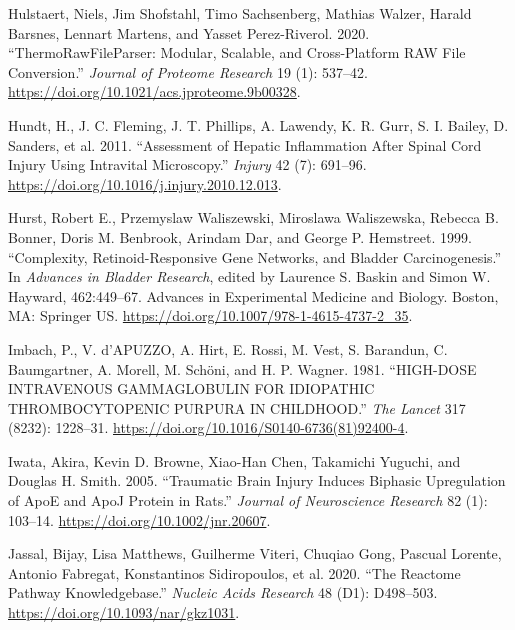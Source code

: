\documentclass[9pt,lineno]{elife}
\newlength{\cslhangindent}
\newlength{\cslentryspacingunit} %
\newenvironment{CSLReferences}[2] %
 {%
  \setlength{\parindent}{0pt}
  \ifodd #1
  \let\oldpar\par
  \def\par{\hangindent=\cslhangindent\oldpar}
  \fi
  \setlength{\parskip}{#2\cslentryspacingunit}
 }%
 {}
\begin{document}
\begin{landscape}
\begin{landscape}
\begin{landscape}
\begin{landscape}
\begin{CSLReferences}{1}{0}
\leavevmode{}%
Hulstaert, Niels, Jim Shofstahl, Timo Sachsenberg, Mathias Walzer, Harald Barsnes, Lennart Martens, and Yasset Perez-Riverol. 2020. {``{ThermoRawFileParser}: {Modular}, {Scalable}, and {Cross-Platform RAW File Conversion}.''} \emph{Journal of Proteome Research} 19 (1): 537--42. \url{https://doi.org/10.1021/acs.jproteome.9b00328}.

\leavevmode{}%
Hundt, H., J. C. Fleming, J. T. Phillips, A. Lawendy, K. R. Gurr, S. I. Bailey, D. Sanders, et al. 2011. {``Assessment of Hepatic Inflammation After Spinal Cord Injury Using Intravital Microscopy.''} \emph{Injury} 42 (7): 691--96. \url{https://doi.org/10.1016/j.injury.2010.12.013}.

\leavevmode{}%
Hurst, Robert E., Przemyslaw Waliszewski, Miroslawa Waliszewska, Rebecca B. Bonner, Doris M. Benbrook, Arindam Dar, and George P. Hemstreet. 1999. {``Complexity, {Retinoid-Responsive Gene Networks}, and {Bladder Carcinogenesis}.''} In \emph{Advances in {Bladder Research}}, edited by Laurence S. Baskin and Simon W. Hayward, 462:449--67. Advances in {Experimental Medicine} and {Biology}. {Boston, MA}: {Springer US}. \url{https://doi.org/10.1007/978-1-4615-4737-2_35}.

\leavevmode{}%
Imbach, P., V. d'APUZZO, A. Hirt, E. Rossi, M. Vest, S. Barandun, C. Baumgartner, A. Morell, M. Schöni, and H. P. Wagner. 1981. {``{HIGH-DOSE INTRAVENOUS GAMMAGLOBULIN FOR IDIOPATHIC THROMBOCYTOPENIC PURPURA IN CHILDHOOD}.''} \emph{The Lancet} 317 (8232): 1228--31. \url{https://doi.org/10.1016/S0140-6736(81)92400-4}.

\leavevmode{}%
Iwata, Akira, Kevin D. Browne, Xiao-Han Chen, Takamichi Yuguchi, and Douglas H. Smith. 2005. {``Traumatic Brain Injury Induces Biphasic Upregulation of {ApoE} and {ApoJ} Protein in Rats.''} \emph{Journal of Neuroscience Research} 82 (1): 103--14. \url{https://doi.org/10.1002/jnr.20607}.

\leavevmode{}%
Jassal, Bijay, Lisa Matthews, Guilherme Viteri, Chuqiao Gong, Pascual Lorente, Antonio Fabregat, Konstantinos Sidiropoulos, et al. 2020. {``The Reactome Pathway Knowledgebase.''} \emph{Nucleic Acids Research} 48 (D1): D498--503. \url{https://doi.org/10.1093/nar/gkz1031}.


\end{CSLReferences}
\end{landscape}
\end{landscape}
\end{landscape}
\end{landscape}
\end{document}
